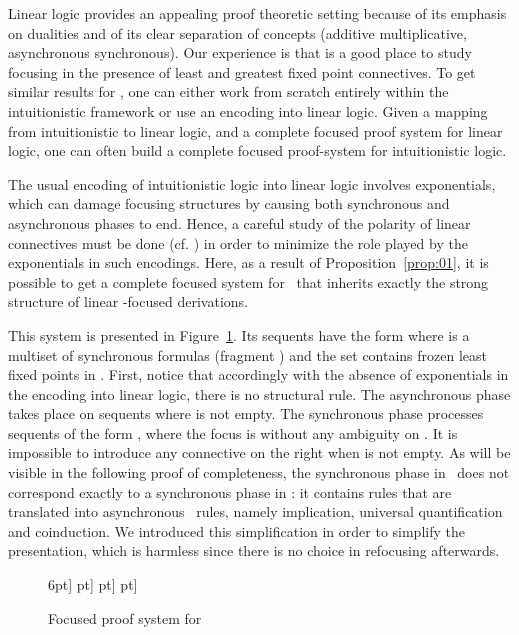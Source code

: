 Linear logic provides an appealing proof theoretic setting because of
its emphasis on dualities and of its clear separation of concepts
(additive \vs{}multiplicative, asynchronous \vs{}synchronous).  Our experience
is that \mumall{} is a good place to study focusing in the presence of
least and greatest fixed point connectives.  To get similar results for
\muLJ, one can either work from scratch entirely
within the intuitionistic framework or use an encoding into linear logic.
Given a mapping from intuitionistic to linear logic, and a complete focused
proof system for linear logic, one can often build a complete
focused proof-system for intuitionistic logic.

The usual encoding of intuitionistic logic into linear logic involves
exponentials, which can damage focusing structures by causing both
synchronous and asynchronous phases to end.
Hence, a careful study of the polarity of linear connectives must
be done (cf. \cite{danos93kgc,liang07csl}) in order to minimize the
role played by the exponentials in such encodings. Here, as a result of
Proposition~\ref{prop:01}, it is possible to get a complete focused
system for \muLJL\ that inherits exactly the strong structure of linear
-focused derivations.

This system is presented in Figure~\ref{fig:muLJL}.
Its sequents have the form  where
 is a multiset of synchronous formulas (fragment )
and the set  contains frozen least fixed points
in .
First, notice that accordingly with the absence of exponentials
in the encoding into linear logic, there is no structural rule.
The asynchronous phase takes place on sequents where  is not empty.
The synchronous phase processes sequents of the form
, where the focus is without any ambiguity on .
It is impossible to introduce any connective on the right when 
 is not empty.
As will be visible in the following proof of completeness,
the synchronous phase in \muLJL\ does not correspond exactly to
a synchronous phase in \mumall: it contains rules that are translated
into asynchronous \mumall\ rules, namely implication, universal
quantification and coinduction.
We introduced this simplification in order to simplify the presentation,
which is harmless since there is no choice in refocusing afterwards.

\begin{figure}[htpb]
\begin{center}
6pt]
\quad
{}
\6pt]
\6pt]
\quad
{}
\quad
{}
\6pt]
\quad
{}
\
\end{center}

\caption{Focused proof system for \muLJL} \label{fig:muLJL}
\end{figure}

